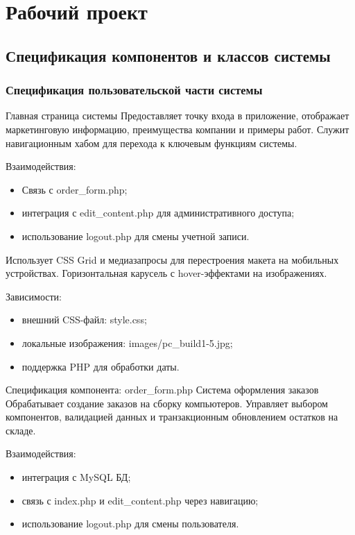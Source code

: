\section{Рабочий проект}
\subsection{Спецификация компонентов и классов системы}
\subsubsection{Спецификация пользовательской части системы}
Главная страница системы
Предоставляет точку входа в приложение, отображает маркетинговую информацию, преимущества компании и примеры работ. Служит навигационным хабом для перехода к ключевым функциям системы.

Взаимодействия:
\begin{itemize}
	\item Связь с order\_form.php;
	\item интеграция с edit\_content.php для административного доступа;
	\item использование logout.php для смены учетной записи.
\end{itemize}

Использует CSS Grid и медиазапросы для перестроения макета на мобильных устройствах.
Горизонтальная карусель с hover-эффектами на изображениях.

Зависимости:
\begin{itemize}
\item внешний CSS-файл: style.css;
\item локальные изображения: images/pc\_build1-5.jpg;
\item поддержка PHP для обработки даты.
\end{itemize}

Спецификация компонента: order\_form.php
Система оформления заказов
Обрабатывает создание заказов на сборку компьютеров. Управляет выбором компонентов, валидацией данных и транзакционным обновлением остатков на складе.

Взаимодействия:
\begin{itemize}
	\item интеграция с MySQL БД;
	\item связь с index.php и edit\_content.php через навигацию;
	\item использование logout.php для смены пользователя.
\end{itemize}


